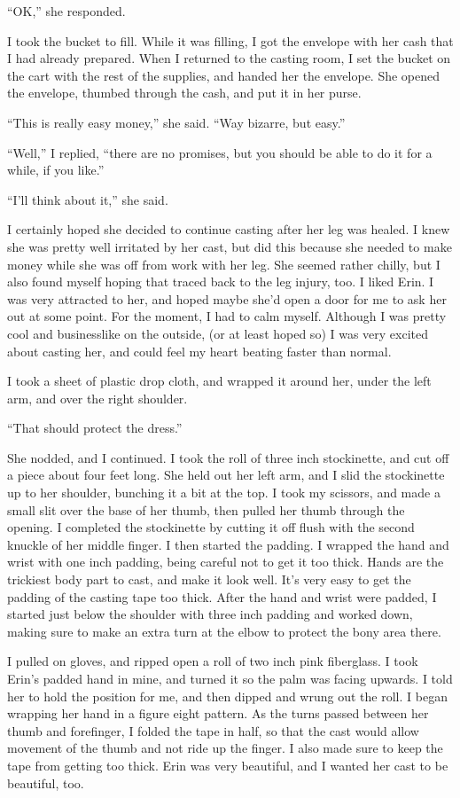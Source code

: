 ``OK,'' she responded.

I took the bucket to fill. While it was filling, I got the envelope with her cash that I had
already prepared. When I returned to the casting room, I set the bucket on the cart with the
rest of the supplies, and handed her the envelope. She opened the envelope, thumbed through the
cash, and put it in her purse.

``This is really easy money,'' she said. ``Way bizarre, but easy.''

``Well,'' I replied, ``there are no promises, but you should be able to do it for a while,
if you like.''

``I'll think about it,'' she said.

I certainly hoped she decided to continue casting after her leg was healed. I knew she was
pretty well irritated by her cast, but did this because she needed to make money while she was
off from work with her leg. She seemed rather chilly, but I also found myself hoping that traced
back to the leg injury, too. I liked Erin. I was very attracted to her, and hoped maybe she'd
open a door for me to ask her out at some point. For the moment, I had to calm myself. Although
I was pretty cool and businesslike on the outside, (or at least hoped so) I was very excited
about casting her, and could feel my heart beating faster than normal.

I took a sheet of plastic drop cloth, and wrapped it around her, under the left arm, and
over the right shoulder.

``That should protect the dress.''

She nodded, and I continued. I took the roll of three inch stockinette, and cut off a piece
about four feet long. She held out her left arm, and I slid the stockinette up to her shoulder,
bunching it a bit at the top. I took my scissors, and made a small slit over the base of her
thumb, then pulled her thumb through the opening. I completed the stockinette by cutting it off
flush with the second knuckle of her middle finger. I then started the padding. I wrapped the
hand and wrist with one inch padding, being careful not to get it too thick. Hands are the
trickiest body part to cast, and make it look well. It's very easy to get the padding of the
casting tape too thick. After the hand and wrist were padded, I started just below the shoulder
with three inch padding and worked down, making sure to make an extra turn at the elbow to
protect the bony area there.

I pulled on gloves, and ripped open a roll of two inch pink fiberglass. I took Erin's padded
hand in mine, and turned it so the palm was facing upwards. I told her to hold the position for
me, and then dipped and wrung out the roll. I began wrapping her hand in a figure eight pattern.
As the turns passed between her thumb and forefinger, I folded the tape in half, so that the
cast would allow movement of the thumb and not ride up the finger. I also made sure to keep the
tape from getting too thick. Erin was very beautiful, and I wanted her cast to be beautiful,
too.

